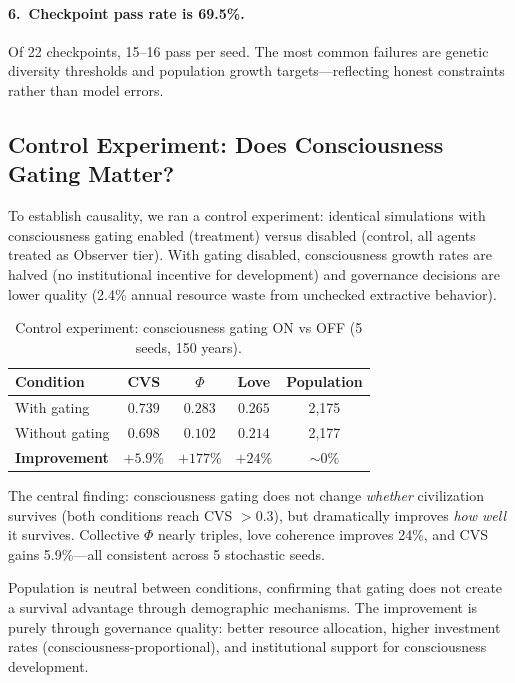 \documentclass[12pt,a4paper]{article}
\begin{document}
\paragraph{6.\ Checkpoint pass rate is 69.5\%.} Of 22 checkpoints, 15--16 pass per seed. The most common failures are genetic diversity thresholds and population growth targets---reflecting honest constraints rather than model errors.

\subsection{Control Experiment: Does Consciousness Gating Matter?}

To establish causality, we ran a control experiment: identical simulations with consciousness gating enabled (treatment) versus disabled (control, all agents treated as Observer tier). With gating disabled, consciousness growth rates are halved (no institutional incentive for development) and governance decisions are lower quality (2.4\% annual resource waste from unchecked extractive behavior).

\begin{table}[h]
\centering
\caption{Control experiment: consciousness gating ON vs OFF (5 seeds, 150 years).}
\label{tab:control}
\begin{tabular}{@{}lcccc@{}}
\toprule
\textbf{Condition} & \textbf{CVS} & \textbf{$\Phi$} & \textbf{Love} & \textbf{Population} \\
\midrule
With gating    & $\mathbf{0.739}$ & $\mathbf{0.283}$ & $\mathbf{0.265}$ & 2,175 \\
Without gating & $0.698$          & $0.102$          & $0.214$          & 2,177 \\
\midrule
\textbf{Improvement} & $+5.9\%$ & $+177\%$ & $+24\%$ & $\sim 0\%$ \\
\bottomrule
\end{tabular}
\end{table}

The central finding: consciousness gating does not change \emph{whether} civilization survives (both conditions reach CVS $> 0.3$), but dramatically improves \emph{how well} it survives. Collective $\Phi$ nearly triples, love coherence improves 24\%, and CVS gains 5.9\%---all consistent across 5 stochastic seeds.

Population is neutral between conditions, confirming that gating does not create a survival advantage through demographic mechanisms. The improvement is purely through governance quality: better resource allocation, higher investment rates (consciousness-proportional), and institutional support for consciousness development.
\end{document}
